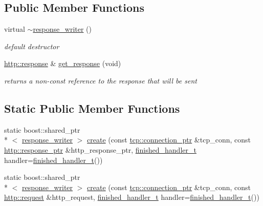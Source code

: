 \subsection*{Public Member Functions}
\begin{DoxyCompactItemize}
\item 
virtual \hyperlink{classpion_1_1http_1_1response__writer_a5e5e539e05550960f3a2819fe5b13a1a}{$\sim$response\-\_\-writer} ()
\begin{DoxyCompactList}\small\item\em default destructor \end{DoxyCompactList}\item 
\hyperlink{classpion_1_1http_1_1response}{http\-::response} \& \hyperlink{classpion_1_1http_1_1response__writer_a65ab6d2a64ac7c76b8bccf4fcf8fc603}{get\-\_\-response} (void)
\begin{DoxyCompactList}\small\item\em returns a non-\/const reference to the response that will be sent \end{DoxyCompactList}\end{DoxyCompactItemize}
\subsection*{Static Public Member Functions}
\begin{DoxyCompactItemize}
\item 
static boost\-::shared\-\_\-ptr\\*
$<$ \hyperlink{classpion_1_1http_1_1response__writer}{response\-\_\-writer} $>$ \hyperlink{classpion_1_1http_1_1response__writer_a041c2e8385612b8a54c87e0889d0935c}{create} (const \hyperlink{namespacepion_1_1tcp_a6c9b7497068009f6d81d95ec0b0627d6}{tcp\-::connection\-\_\-ptr} \&tcp\-\_\-conn, const \hyperlink{namespacepion_1_1http_af92bc593f2514fe8733175dafec7cd33}{http\-::response\-\_\-ptr} \&http\-\_\-response\-\_\-ptr, \hyperlink{classpion_1_1http_1_1writer_a7e3ce4b88e0427adf673a99fca3af982}{finished\-\_\-handler\-\_\-t} handler=\hyperlink{classpion_1_1http_1_1writer_a7e3ce4b88e0427adf673a99fca3af982}{finished\-\_\-handler\-\_\-t}())
\item 
static boost\-::shared\-\_\-ptr\\*
$<$ \hyperlink{classpion_1_1http_1_1response__writer}{response\-\_\-writer} $>$ \hyperlink{classpion_1_1http_1_1response__writer_a705bbb07a19c63eb201e24b90357c4ff}{create} (const \hyperlink{namespacepion_1_1tcp_a6c9b7497068009f6d81d95ec0b0627d6}{tcp\-::connection\-\_\-ptr} \&tcp\-\_\-conn, const \hyperlink{classpion_1_1http_1_1request}{http\-::request} \&http\-\_\-request, \hyperlink{classpion_1_1http_1_1writer_a7e3ce4b88e0427adf673a99fca3af982}{finished\-\_\-handler\-\_\-t} handler=\hyperlink{classpion_1_1http_1_1writer_a7e3ce4b88e0427adf673a99fca3af982}{finished\-\_\-handler\-\_\-t}())
\end{DoxyCompactItemize}
